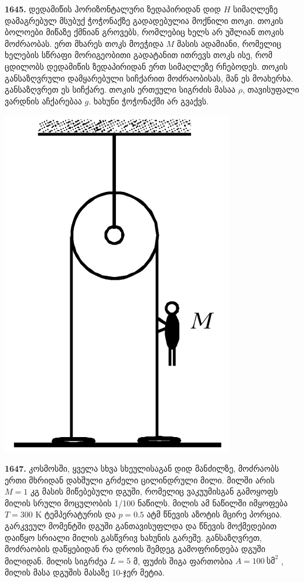 \documentclass[12pt,a4paper,]{report}
\begin{document}
\textbf{1645.} დედამიწის ჰორიზონტალური ზედაპირიდან დიდ $H$ სიმაღლეზე დამაგრებულ მსუბუქ ჭოჭონაქზე გადადებულია მოქნილი თოკი. თოკის ბოლოები მიწაზე ქმნიან გროვებს, რომლებიც ხელს არ უშლიან თოკის მოძრაობას. ერთ მხარეს თოკს მოეჭიდა $M$ მასის ადამიანი, რომელიც ხელების სწრაფი მორიგეობითი გადატანით ითრევს თოკს ისე, რომ ცდილობს დედამიწის ზედაპირიდან ერთ სიმაღლეზე რჩებოდეს. თოკის განსაზღვრული დამყარებული სიჩქარით მოძრაობისას, მან ეს მოახერხა. განსაზღვრეთ ეს სიჩქარე. თოკის ერთეული სიგრძის მასაა $\rho$, თავისუფალი ვარდნის აჩქარებაა $g$. ხახუნი ჭოჭონაქში არ გვაქვს.
	\begin{center}
		\includegraphics[scale=0.2]{images/1645}
	\end{center}

\textbf{1647.} კოსმოსში, ყველა სხვა სხეულისაგან დიდ მანძილზე, მოძრაობს ერთი მხრიდან დახშული გრძელი ცილინდრული მილი. მილში არის $M=1$ კგ მასის მიწებებული დგუში, რომელიც ვაკუუმისგან გამოყოფს მილის სრული მოცულობის 1/100 ნაწილს. მილის ამ ნაწილში იმყოფება $T=300$ K ტემპერატურის და $p=0.5$ ატმ წნევის აზოტის მცირე პორცია. გარკვეულ მომენტში დგუში განთავისუფლდა და წნევის მოქმედებით დაიწყო სრიალი მილის გასწვრივ ხახუნის გარეშე. განსაზღვრეთ, მოძრაობის დაწყებიდან რა დროის შემდეგ გამოფრინდება დგუში მილიდან. მილის სიგრძეა $L=5$ მ, ფუძის შიგა ფართობია $A=100\ \text{სმ}^2$ , მილის მასა დგუშის მასაზე 10-ჯერ მეტია.
\end{document}
